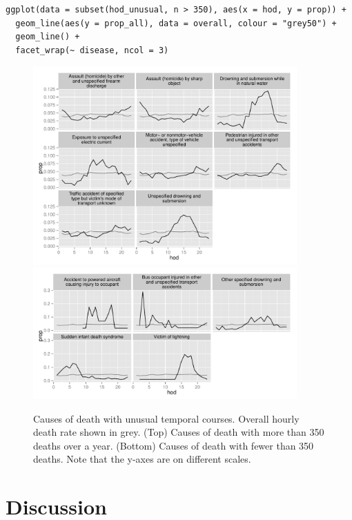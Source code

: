 \documentclass[article]{jss}
\begin{document}
\begin{Verbatim}
ggplot(data = subset(hod_unusual, n > 350), aes(x = hod, y = prop)) + 
  geom_line(aes(y = prop_all), data = overall, colour = "grey50") +
  geom_line() + 
  facet_wrap(~ disease, ncol = 3)
\end{Verbatim}

\begin{figure}[htbp]
  \centering
    \includegraphics[width=0.9\textwidth]{case-study/unusual-big}
    \includegraphics[width=0.9\textwidth]{case-study/unusual-sml}
  \caption{Causes of death with unusual temporal courses. Overall hourly death rate shown in grey. (Top) Causes of death with more than 350 deaths over a year. (Bottom) Causes of death with fewer than 350 deaths. Note that the y-axes are on different scales.}
  \label{fig:disease}
\end{figure}

\section{Discussion}
\label{sec:discussion}
\end{document}
